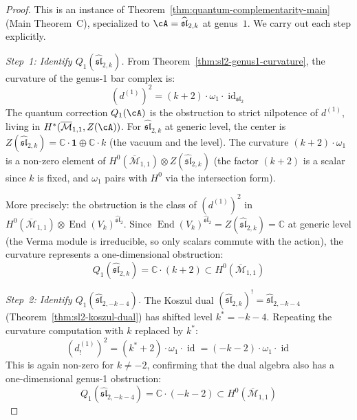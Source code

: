 \begin{proof}
This is an instance of Theorem~\ref{thm:quantum-complementarity-main} (Main Theorem~C), specialized to $\cA = \widehat{\mathfrak{sl}}_{2,k}$ at genus~$1$.  We carry out each step explicitly.

\emph{Step~1: Identify $Q_1(\widehat{\mathfrak{sl}}_{2,k})$.}
From Theorem~\ref{thm:sl2-genus1-curvature}, the curvature of the genus-1 bar complex is:
\begin{equation}
(d^{(1)})^2 = (k+2) \cdot \omega_1 \cdot \operatorname{id}_{\mathfrak{sl}_2}
\end{equation}
The quantum correction $Q_1(\cA)$ is the obstruction to strict nilpotence of $d^{(1)}$, living in $H^*(\overline{\mathcal{M}}_{1,1}, Z(\cA))$.  For $\widehat{\mathfrak{sl}}_{2,k}$ at generic level, the center is $Z(\widehat{\mathfrak{sl}}_{2,k}) = \mathbb{C} \cdot \mathbf{1} \oplus \mathbb{C} \cdot k$ (the vacuum and the level).  The curvature $(k+2) \cdot \omega_1$ is a non-zero element of $H^0(\overline{\mathcal{M}}_{1,1}) \otimes Z(\widehat{\mathfrak{sl}}_{2,k})$ (the factor $(k+2)$ is a scalar since $k$ is fixed, and $\omega_1$ pairs with $H^0$ via the intersection form).

More precisely: the obstruction is the class of $(d^{(1)})^2$ in $H^0(\overline{\mathcal{M}}_{1,1}) \otimes \operatorname{End}(V_k)^{\widehat{\mathfrak{sl}}_2}$.  Since $\operatorname{End}(V_k)^{\widehat{\mathfrak{sl}}_2} = Z(\widehat{\mathfrak{sl}}_{2,k}) = \mathbb{C}$ at generic level (the Verma module is irreducible, so only scalars commute with the action), the curvature represents a one-dimensional obstruction:
\begin{equation}
Q_1(\widehat{\mathfrak{sl}}_{2,k}) = \mathbb{C} \cdot (k+2) \subset H^0(\overline{\mathcal{M}}_{1,1})
\end{equation}

\emph{Step~2: Identify $Q_1(\widehat{\mathfrak{sl}}_{2,-k-4})$.}
The Koszul dual $(\widehat{\mathfrak{sl}}_{2,k})^! = \widehat{\mathfrak{sl}}_{2,-k-4}$ (Theorem~\ref{thm:sl2-koszul-dual}) has shifted level $k^* = -k-4$.  Repeating the curvature computation with $k$ replaced by $k^*$:
\begin{equation}
(d^{(1)}_!)^2 = (k^* + 2) \cdot \omega_1 \cdot \operatorname{id} = (-k-2) \cdot \omega_1 \cdot \operatorname{id}
\end{equation}
This is again non-zero for $k \neq -2$, confirming that the dual algebra also has a one-dimensional genus-1 obstruction:
\begin{equation}
Q_1(\widehat{\mathfrak{sl}}_{2,-k-4}) = \mathbb{C} \cdot (-k-2) \subset H^0(\overline{\mathcal{M}}_{1,1})
\end{equation}


\end{proof}
